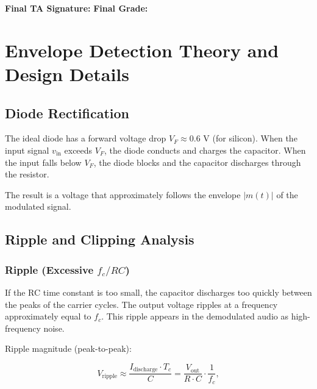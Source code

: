 \documentclass[11pt,letterpaper]{article}
\begin{document}
\vspace{0.5cm}

\textbf{Final TA Signature:} \underline{\hspace{4cm}} \quad \textbf{Final Grade:} \underline{\hspace{1.5cm}}

\clearpage

\appendix

\section{Envelope Detection Theory and Design Details}

\subsection{Diode Rectification}

The ideal diode has a forward voltage drop $V_F \approx 0.6$ V (for silicon). When the input signal $v_{\text{in}}$ exceeds $V_F$, the diode conducts and charges the capacitor. When the input falls below $V_F$, the diode blocks and the capacitor discharges through the resistor.

\noindent
The result is a voltage that approximately follows the envelope $|m(t)|$ of the modulated signal.

\subsection{Ripple and Clipping Analysis}

\subsubsection*{Ripple (Excessive $f_c / RC$)}

If the RC time constant is too small, the capacitor discharges too quickly between the peaks of the carrier cycles. The output voltage ripples at a frequency approximately equal to $f_c$. This ripple appears in the demodulated audio as high-frequency noise.

\noindent
Ripple magnitude (peak-to-peak):

\begin{equation}
V_{\text{ripple}} \approx \frac{I_{\text{discharge}} \cdot T_c}{C} = \frac{V_{\text{out}}}{R \cdot C} \cdot \frac{1}{f_c},
\end{equation}
\end{document}
